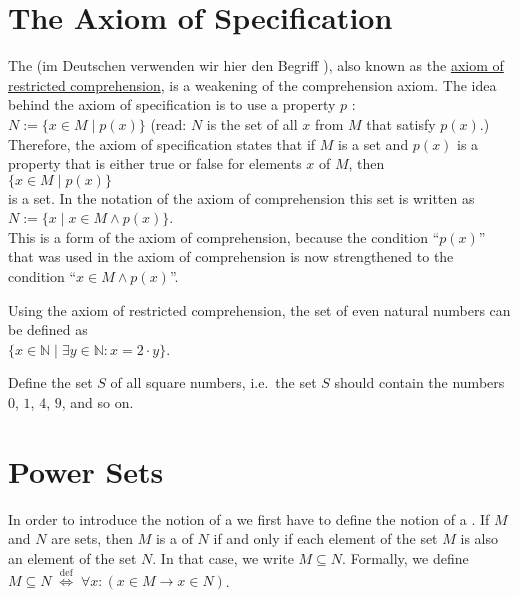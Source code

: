 \section{The Axiom of Specification}
The  
(im Deutschen verwenden wir hier den Begriff ),
also known as the 
\href{https://en.wikipedia.org/wiki/Axiom_schema_of_specification}{axiom of restricted comprehension},
is a weakening of the comprehension axiom.  The idea behind the axiom of specification
is to use a property $p$ : 
\\[0.2cm]
\hspace*{1.3cm}
$N := \{ x\in M \;|\; p(x) \}$ \qquad (read: $N$ is the set of all $x$ from $M$ that satisfy $p(x)$.)
\\[0.2cm]
Therefore,  the axiom of specification states that if $M$ is a set and $p(x)$ is a property that is either true
or false for elements $x$ of $M$, then 
\\[0.2cm]
\hspace*{1.3cm}
$\{ x\in M \;|\; p(x) \}$ 
\\[0.2cm]
is a set.  In the notation of the axiom of comprehension this set is written as 
\\[0.2cm]
\hspace*{1.3cm}
$N := \{ x \mid x \in M \wedge p(x) \}$. 
\\[0.2cm]
This is a  form of the axiom of comprehension, because the condition ``$p(x)$'' that was used in the
axiom of comprehension is now strengthened to the condition ``$x \in M \wedge p(x)$''.


\exampleEng
Using the axiom of restricted comprehension, the set of even natural numbers can be defined as 
\\[0.2cm]
\hspace*{1.3cm}
 $\{ x \in \mathbb{N} \;|\; \exists y\in \mathbb{N}: x = 2 \cdot y \}$. 

\exerciseEng
Define the set $S$ of all square numbers, i.e.~the set $S$ should contain the numbers $0$, $1$, $4$, $9$, and
so on.
\eox

\section{Power Sets}
In order to introduce the notion of a  we first have to define the notion of a .
If $M$ and $N$ are sets, then $M$ is a  of $N$ if and only if each element of the
set $M$ is also an element of the set $N$.  In that case, we write $M \subseteq N$.  Formally, we define
 \\[0.2cm]
\hspace*{1.3cm}
$M \subseteq N \;\stackrel{\mathrm{def}}{\Longleftrightarrow}\; \forall x: (x \in M \rightarrow x \in N)$.

